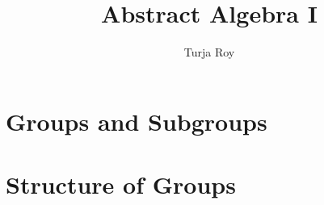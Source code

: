 

\title{
    Abstract Algebra I
}

\author{
    Turja Roy
}
\date{}


\maketitle

\tableofcontents
\newpage


\newpage
\section{Groups and Subgroups}
    
    
    
    
    
    
    
\section{Structure of Groups}
    
    
    
    
\newpage

\newpage


